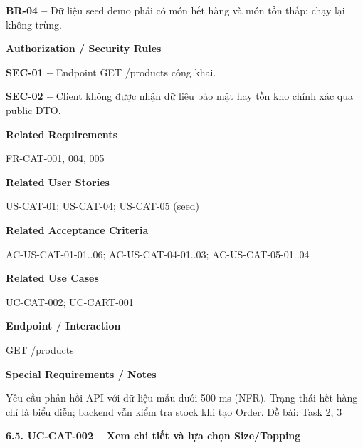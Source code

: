 \documentclass[11pt,a4paper,oneside]{report}
\begin{document}
\textbf{BR-04 --} Dữ liệu seed demo phải có món hết hàng và món tồn thấp; chạy lại không trùng.
\par

\par\smallskip\noindent\textcolor{sgublue}{\textbf{Authorization / Security Rules}}\par\nobreak
\textbf{SEC-01 --} Endpoint GET /products công khai.

\textbf{SEC-02 --} Client không được nhận dữ liệu bảo mật hay tồn kho chính xác qua public DTO.
\par

\par\smallskip\noindent\textcolor{sgublue}{\textbf{Related Requirements}}\par\nobreak
FR-CAT-001, 004, 005
\par

\par\smallskip\noindent\textcolor{sgublue}{\textbf{Related User Stories}}\par\nobreak
US-CAT-01; US-CAT-04; US-CAT-05 (seed)
\par

\par\smallskip\noindent\textcolor{sgublue}{\textbf{Related Acceptance Criteria}}\par\nobreak
AC-US-CAT-01-01..06; AC-US-CAT-04-01..03; AC-US-CAT-05-01..04
\par

\par\smallskip\noindent\textcolor{sgublue}{\textbf{Related Use Cases}}\par\nobreak
UC-CAT-002; UC-CART-001
\par

\par\smallskip\noindent\textcolor{sgublue}{\textbf{Endpoint / Interaction}}\par\nobreak
GET /products
\par

\par\smallskip\noindent\textcolor{sgublue}{\textbf{Special Requirements / Notes}}\par\nobreak
Yêu cầu phản hồi API với dữ liệu mẫu dưới 500 ms (NFR). Trạng thái hết hàng chỉ là biểu diễn; backend vẫn kiểm tra stock khi tạo Order. \textbar{} Đề bài: Task 2, 3
\par



\textbf{6.5. UC-CAT-002 -- Xem chi tiết và lựa chọn Size/Topping}
\end{document}
